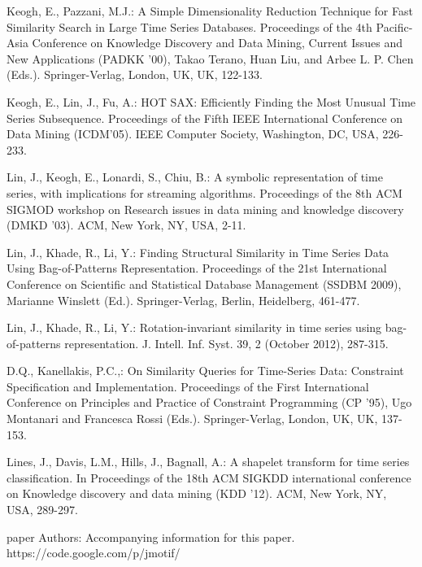\documentclass{llncs}
\begin{document}
\begin{thebibliography}{5}
Keogh, E., Pazzani, M.J.:
A Simple Dimensionality Reduction Technique for Fast Similarity Search in Large Time Series Databases. 
Proceedings of the 4th Pacific-Asia Conference on Knowledge Discovery and Data Mining, Current Issues and New Applications (PADKK '00), 
Takao Terano, Huan Liu, and Arbee L. P. Chen (Eds.). Springer-Verlag, London, UK, UK, 122-133.

Keogh, E., Lin, J., Fu, A.:
HOT SAX: Efficiently Finding the Most Unusual Time Series Subsequence. 
Proceedings of the Fifth IEEE International Conference on Data Mining (ICDM'05). 
IEEE Computer Society, Washington, DC, USA, 226-233.

Lin, J., Keogh, E., Lonardi, S., Chiu, B.:
A symbolic representation of time series, with implications for streaming algorithms. 
Proceedings of the 8th ACM SIGMOD workshop on Research issues in data mining and knowledge discovery (DMKD '03).
ACM, New York, NY, USA, 2-11.

Lin, J., Khade, R., Li, Y.:
Finding Structural Similarity in Time Series Data Using Bag-of-Patterns Representation. 
Proceedings of the 21st International Conference on Scientific and Statistical Database Management (SSDBM 2009),
Marianne Winslett (Ed.). Springer-Verlag, Berlin, Heidelberg, 461-477.

Lin, J., Khade, R., Li, Y.:
Rotation-invariant similarity in time series using bag-of-patterns representation. 
J. Intell. Inf. Syst. 39, 2 (October 2012), 287-315.

D.Q., Kanellakis, P.C.,:
On Similarity Queries for Time-Series Data: Constraint Specification and Implementation. 
Proceedings of the First International Conference on Principles and Practice of Constraint Programming (CP '95), 
Ugo Montanari and Francesca Rossi (Eds.). Springer-Verlag, London, UK, UK, 137-153.

Lines, J., Davis, L.M., Hills, J., Bagnall, A.:
A shapelet transform for time series classification. 
In Proceedings of the 18th ACM SIGKDD international conference on Knowledge discovery and data mining (KDD '12). 
ACM, New York, NY, USA, 289-297.


paper Authors: 
Accompanying information for this paper. 
https://code.google.com/p/jmotif/

\end{thebibliography}

%
\end{document}
